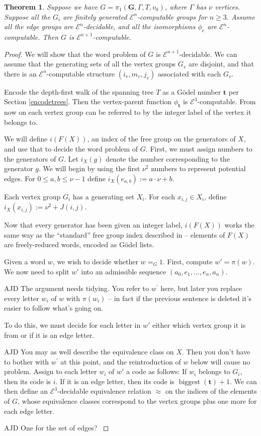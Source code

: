 \documentclass[a4paper]{article}
\newcommand{\grz}[1]{$\mathcal{E}^{#1}$}	%
\newcommand{\tvec}{\mathbf{t}}	%
\newcommand{\fgoagog}{\pi_1(\mathbf{G},\Gamma,T,v_0)}	%
\theoremstyle{plain}
\newtheorem{theorem}{Theorem}[section]
\theoremstyle{definition}
\newenvironment{ad}{\noindent\color{blue} AJD }{}
\newcommand{\ajd}[1]{
\begin{ad} #1 \end{ad}}
\begin{document}
\begin{theorem} \label{thm:fgoagogcomp}
Suppose we have $G = \fgoagog$, where $\Gamma$ has $\nu$ vertices. Suppose 
all the $G_i$ are finitely generated \grz{n}-computable groups for $n \geq 3$. Assume all the edge groups are \grz{n}-decidable, and all the isomorphisms $\phi_e$ are \grz{n}-computable. Then $G$ is \grz{n+1}-computable.
\end{theorem}

\begin{proof}
	We will show that the word problem of $G$ is \grz{n+1}-decidable. We can assume that the generating sets of all the vertex groups $G_v$ are disjoint, and that there is an \grz{n}-computable structure $(i_v,m_v,j_v)$ associated with 
each $G_v$.

Encode the depth-first walk of the spanning tree $T$ as a G\"odel number $\tvec$ per Section \ref{encodetrees}. Then the vertex-parent function $\phi_{\tvec}$ is \grz{3}-computable. From now on each vertex group can be referred to by the integer label of the vertex it belongs to.

We will define $i(F(X))$, an index of the free group on the generators of $X$, and use that to decide the word problem of $G$. First, we must assign numbers to the generators of $G$. Let $i_X(g)$ denote the number corresponding to the generator $g$. We will begin by using the first $\nu^2$ numbers to represent potential edges. For $0 \leq a,b \leq \nu - 1$ define $i_X(e_{a,b}) := a \cdot \nu + b$.

Each vertex group $G_i$ has a generating set $X_i$. For each $x_{i,j} \in X_i$, define $i_X(x_{i,j}) := \nu^2 + J(i,j)$.

Now that every generator has been given an integer label, $i(F(X))$ works the same way as the ``standard'' free group index described in \cite[Lemma 3.1]{Cannonito_1973} -- elements of $F(X)$ are freely-reduced words, encoded as G\"odel lists.

Given a word $w$, we wish to decide whether $w =_G 1$. First, compute $w' = \pi(w)$. We now need to split $w'$ into an admissible sequence $(a_0,e_1,\dots,e_n,a_n)$. 

\ajd{The argument needs tidying. You refer to $w^\prime$
here, but later you replace every letter  $w_i$ of $w$ with $\pi(w_i)$ --
in fact if  the previous sentence is deleted it's easier to follow
what's going on.}

To do this, we must decide for each letter in $w'$ either which vertex group it is from or if it is an edge letter. 
\ajd{You may as well describe the equivalence class on $X$. Then you don't
have to bother with $w^\prime$ at this point, and the reintroduction of $w$ 
below will cause no problem.} 
Assign to each letter $w_i$ of $w'$ a code as follows: If $w_i$ belongs to $G_i$, then its code is $i$. If it is an edge letter, then its code is $\operatorname{biggest}(\tvec)+1$. We can then define an \grz{3}-decidable equivalence relation $\approx$ on the indices of the elements of $G$, whose equivalence classes correspond to the vertex groups plus one more for each edge letter. 
\ajd{One for the set of edges?}



\end{proof}
\end{document}
